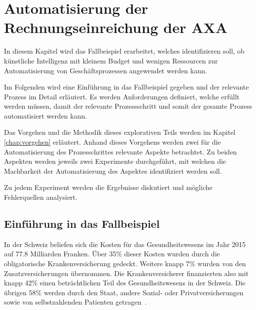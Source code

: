 \cleardoublepage
\section{Automatisierung der Rechnungseinreichung der AXA }
\label{chap:experiment}

In diesem Kapitel wird das Fallbeispiel erarbeitet, welches identifizieren soll, ob künstliche Intelligenz mit kleinem Budget und wenigen Ressourcen zur Automatisierung von Geschäftsprozessen angewendet werden kann. 

Im Folgenden wird eine Einführung in das Fallbeispiel gegeben und der relevante Prozess im Detail erläutert. Es werden Anforderungen definiert, welche erfüllt werden müssen, damit der relevante Prozessschritt und somit der gesamte Prozess automatisiert werden kann.

Das Vorgehen und die Methodik dieses explorativen Teils werden im Kapitel \ref{chap:vorgehen} erläutert. Anhand dieses Vorgehens werden zwei für die Automatisierung des Prozesschrittes relevante Aspekte betrachtet. Zu beiden Aspekten werden jeweils zwei Experimente durchgeführt, mit welchen die Machbarkeit der Automatisierung des Aspektes identifiziert werden soll.

Zu jedem Experiment werden die Ergebnisse diskutiert und mögliche Fehlerquellen analysiert.




\subsection{Einführung in das Fallbeispiel}
In der Schweiz beliefen sich die Kosten für das Gesundheitswesens im Jahr 2015 auf 77.8 Milliarden Franken. Über 35\% dieser Kosten wurden durch die obligatorische Krankenversicherung gedeckt. Weitere knapp 7\% wurden von den Zusatzversicherungen übernommen. Die Krankenversicherer finanzierten also mit knapp 42\% einen beträchtlichen Teil des Gesundheitswesens in der Schweiz. Die übrigen 58\% werden durch den Staat, andere Sozial- oder Privatversicherungen sowie von selbstzahlenden Patienten getragen~\autocite{BfS2018}.

